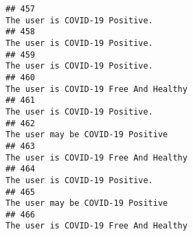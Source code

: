 \documentclass[
]{article}
\begin{document}
\begin{verbatim}
## 457                                                                                                                                                                                                                                     The user is COVID-19 Positive.
## 458                                                                                                                                                                                                                                     The user is COVID-19 Positive.
## 459                                                                                                                                                                                                                                     The user is COVID-19 Positive.
## 460                                                                                                                                                                                                                              The user is COVID-19 Free And Healthy
## 461                                                                                                                                                                                                                                     The user is COVID-19 Positive.
## 462                                                                                                                                                                                                                                  The user may be COVID-19 Positive
## 463                                                                                                                                                                                                                              The user is COVID-19 Free And Healthy
## 464                                                                                                                                                                                                                                     The user is COVID-19 Positive.
## 465                                                                                                                                                                                                                                  The user may be COVID-19 Positive
## 466                                                                                                                                                                                                                              The user is COVID-19 Free And Healthy

\end{verbatim}
\end{document}
